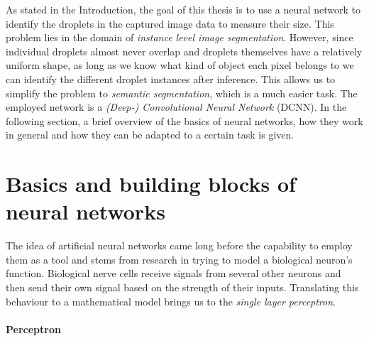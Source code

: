 As stated in the Introduction, the goal of this thesis is to use a neural network to identify the droplets in the captured image data to measure their size. 
This problem lies in the domain of \emph{instance level image segmentation}.
However, since individual droplets almost never overlap and droplets themselves have a relatively uniform shape, as long as we know what kind of object each pixel belongs to we can identify the different droplet instances after inference.
This allows us to simplify the problem to \emph{semantic segmentation}, which is a much easier task.
The employed network is a \emph{(Deep-) Convolutional Neural Network} (DCNN). In the following section, a brief overview of the basics of neural networks, how they work in general and how they can be adapted to a certain task is given. 

\section{Basics and building blocks of neural networks}
\label{sec:building_blocks}

The idea of artificial neural networks came long before the capability to employ them as a tool and stems from research in trying to model a biological neuron's function. Biological nerve cells receive signals from several other neurons and then send their own signal based on the strength of their inputs. Translating this behaviour to a mathematical model brings us to the \emph{single layer perceptron}.

\paragraph*{Perceptron}

